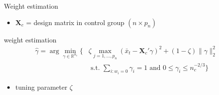 \documentclass[xcolor=dvipsnames, handout]{beamer}
\begin{document}
\begin{frame}{Weight estimation}
\begin{itemize}
  \item $\mathbf{X}_c$ = design matrix in control group $(n \times p_n)$
\end{itemize}
weight estimation
\begin{align*}
  \hat{\gamma} = \arg \min_{\gamma \in \mathbb{R}^{n_c}} 
  \Big\{ &
    \zeta \max_{j = 1, \dotsc, p_n} (\bar{x}_t - \mathbf{X}_c' \gamma)^2 + (1 - \zeta) \lVert  \gamma \rVert_2^2
  \\
    & \text{ s.t. } \sum_{i : w_i = 0} \gamma_i = 1 \text{ and } 0 \leq \gamma_i \leq n_c^{-2/3}
  \Big\}
\end{align*}
\begin{itemize}
  \item tuning parameter $\zeta$
\end{itemize}
\end{frame}

\appendix
\end{document}
